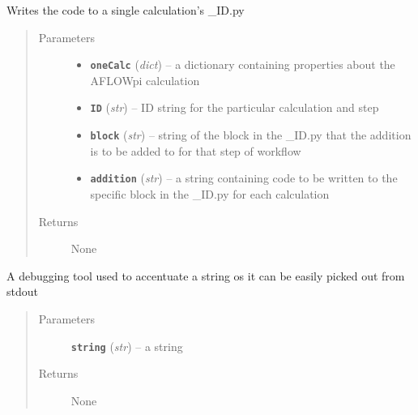 \documentclass[letterpaper,10pt,english]{sphinxmanual}
\begin{document}
\begin{fulllineitems}
\label{prep:prep.__addToBlock}
Writes the code to a single calculation's \_ID.py
\begin{quote}\begin{description}
\item[{Parameters}] \leavevmode\begin{itemize}
\item {} 
\textbf{\texttt{oneCalc}} (\emph{dict}) -- a dictionary containing properties about the AFLOWpi calculation

\item {} 
\textbf{\texttt{ID}} (\emph{str}) -- ID string for the particular calculation and step

\item {} 
\textbf{\texttt{block}} (\emph{str}) -- string of the block in the \_ID.py that the addition is to be added to
for that step of workflow

\item {} 
\textbf{\texttt{addition}} (\emph{str}) -- a string containing code to be written to the specific block
in the \_ID.py for each calculation

\end{itemize}

\item[{Returns}] \leavevmode
None

\end{description}\end{quote}

\end{fulllineitems}


\begin{fulllineitems}
\label{prep:prep.__announcePrint}
A debugging tool used to accentuate a string os it can be easily picked out from stdout
\begin{quote}\begin{description}
\item[{Parameters}] \leavevmode
\textbf{\texttt{string}} (\emph{str}) -- a string

\item[{Returns}] \leavevmode
None

\end{description}\end{quote}

\end{fulllineitems}
\end{document}
